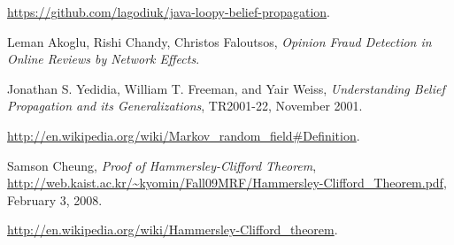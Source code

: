 \documentclass[10pt]{article}
\begin{document}
\newpage

\begin{thebibliography}{9}

  \url{https://github.com/lagodiuk/java-loopy-belief-propagation}.

  Leman Akoglu, Rishi Chandy, Christos Faloutsos,
  \emph{Opinion Fraud Detection in Online Reviews by Network Effects}.

  Jonathan S. Yedidia, William T. Freeman, and Yair Weiss,
  \emph{Understanding Belief Propagation and its Generalizations},
  TR2001-22, 
  November 2001.
  
  \url{http://en.wikipedia.org/wiki/Markov_random_field#Definition}.
  
  Samson Cheung,
  \emph{Proof of Hammersley-Clifford Theorem},
  \url{http://web.kaist.ac.kr/~kyomin/Fall09MRF/Hammersley-Clifford_Theorem.pdf},
  February 3, 2008.

  \url{http://en.wikipedia.org/wiki/Hammersley-Clifford_theorem}.

\end{thebibliography}
\end{document}
